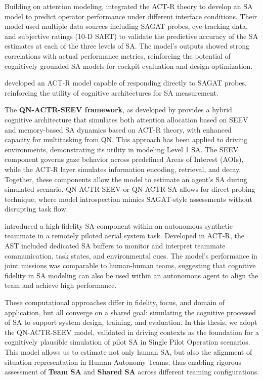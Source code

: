 \documentclass[12pt,a4paper]{article} %
\begin{document}
	Building on attention modeling, \textcite{chen_developing_2021} integrated the ACT-R theory to develop an SA model to predict operator performance under different interface conditions. Their model used multiple data sources including SAGAT probes, eye-tracking data, and subjective ratings (10-D SART) to validate the predictive accuracy of the SA estimates at each of the three levels of SA. The model's outputs showed strong correlations with actual performance metrics, reinforcing the potential of cognitively grounded SA models for cockpit evaluation and design optimization.

	\textcite{juarez-espinosa_situation_nodate} developed an ACT-R model capable of responding directly to SAGAT probes, reinforcing the utility of cognitive architectures for SA measurement.

	The \textbf{QN-ACTR-SEEV framework}, as developed by \textcite{rehman_phd_thesis} provides a hybrid cognitive architecture that simulates both attention allocation based on SEEV and memory-based SA dynamics based on ACT-R theory, with enhanced capacity for multitasking from QN. This approach has been applied to driving environments, demonstrating its utility in modeling Level 1 SA. The SEEV component governs gaze behavior across predefined Areas of Interest (AOIs), while the ACT-R layer simulates information encoding, retrieval, and decay. Together, these components allow the model to estimate an agent's SA during simulated scenario.
	QN-ACTR-SEEV or QN-ACTR-SA allows for direct probing technique, where model introspection mimics SAGAT-style assessments without disrupting task flow.
	
	\textcite{freiman_assessing_2019} introduced a high-fidelity SA component within an autonomous synthetic teammate in a remotely piloted aerial system task. Developed in ACT-R, the AST included dedicated SA buffers to monitor and interpret teammate communication, task states, and environmental cues. The model's performance in joint missions was comparable to human-human teams, suggesting that cognitive fidelity in SA modeling can also be used within an autonomous agent to align the team and achieve high performance.

	These computational approaches differ in fidelity, focus, and domain of application, but all converge on a shared goal: simulating the cognitive processed of SA to support system design, training, and evaluation. In this thesis, we adopt the QN-ACTR-SEEV model, validated in driving contexts as the foundation for a cognitively plausible simulation of pilot SA in Single Pilot Operation scenarios. This model allows us to estimate not only human SA, but also the alignment of situation representation in Human-Autonomy Teams, thus enabling rigorous assessment of \textbf{Team SA} and \textbf{Shared SA} across different teaming configurations.
\end{document}
